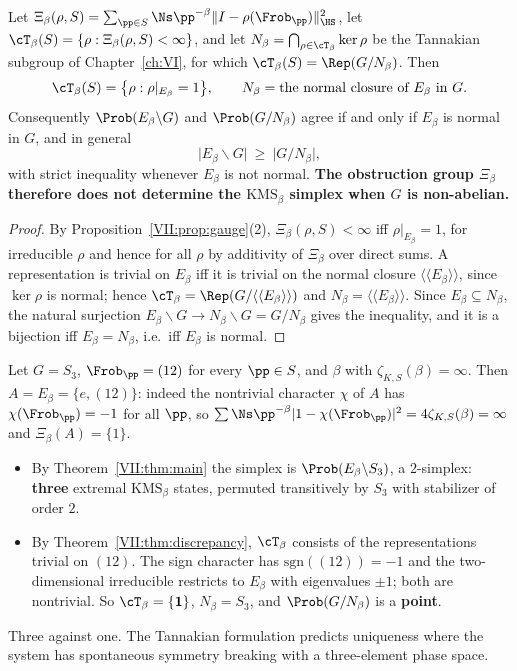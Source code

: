 \begin{theorem}[Discrepancy]\label{VII:thm:discrepancy}
Let $\Xi_\beta(\rho,S)=\sum_{\pp\in S}\Ns\pp^{-\beta}\|I-\rho(\Frob_\pp)\|_{\HS}^2$, let
$\cT_\beta(S)=\{\rho:\Xi_\beta(\rho,S)<\infty\}$, and let $N_\beta=\bigcap_{\rho\in\cT_\beta}\ker\rho$
be the Tannakian subgroup of Chapter~\ref{ch:VI}, for which $\cT_\beta(S)=\Rep(G/N_\beta)$. Then
\[
\cT_\beta(S)=\bigl\{\rho:\rho|_{E_\beta}=1\bigr\},
\qquad
N_\beta=\text{the normal closure of }E_\beta\text{ in }G .
\]
Consequently $\Prob(E_\beta\backslash G)$ and $\Prob(G/N_\beta)$ agree if and only if
$E_\beta$ is normal in $G$, and in general
\[
\bigl|E_\beta\backslash G\bigr|\ \ge\ \bigl|G/N_\beta\bigr| ,
\]
with strict inequality whenever $E_\beta$ is not normal. \textbf{The obstruction group
$\Xi_\beta$ therefore does not determine the $\mathrm{KMS}_\beta$ simplex when $G$ is
non-abelian.}
\end{theorem}

\begin{proof}
By Proposition~\ref{VII:prop:gauge}(2), $\Xi_\beta(\rho,S)<\infty$ iff $\rho|_{E_\beta}=1$, for
irreducible $\rho$ and hence for all $\rho$ by additivity of $\Xi_\beta$ over direct sums.
A representation is
trivial on $E_\beta$ iff it is trivial on the normal closure $\langle\langle E_\beta\rangle\rangle$,
since $\ker\rho$ is normal; hence $\cT_\beta=\Rep(G/\langle\langle E_\beta\rangle\rangle)$ and
$N_\beta=\langle\langle E_\beta\rangle\rangle$. Since $E_\beta\subseteq N_\beta$, the natural
surjection $E_\beta\backslash G\to N_\beta\backslash G=G/N_\beta$ gives the inequality, and it
is a bijection iff $E_\beta=N_\beta$, i.e.\ iff $E_\beta$ is normal.
\end{proof}

\begin{example}\label{VII:ex:S3}
Let $G=S_3$, $\Frob_\pp=(12)$ for every $\pp\in S$, and $\beta$ with
$\zeta_{K,S}(\beta)=\infty$. Then $A=E_\beta=\{e,(12)\}$: indeed the nontrivial character
$\chi$ of $A$ has $\chi(\Frob_\pp)=-1$ for all $\pp$, so
$\sum\Ns\pp^{-\beta}|1-\chi(\Frob_\pp)|^2=4\zeta_{K,S}(\beta)=\infty$ and
$\Xi_\beta(A)=\{1\}$.
\begin{itemize}
\item By Theorem~\ref{VII:thm:main} the simplex is $\Prob(E_\beta\backslash S_3)$, a
$2$-simplex: \textbf{three} extremal $\mathrm{KMS}_\beta$ states, permuted transitively by
$S_3$ with stabilizer of order $2$.
\item By Theorem~\ref{VII:thm:discrepancy}, $\cT_\beta$ consists of the representations trivial
on $(12)$. The sign character has $\mathrm{sgn}((12))=-1$ and the two-dimensional
irreducible restricts to $E_\beta$ with eigenvalues $\pm1$; both are nontrivial. So
$\cT_\beta=\{\mathbf 1\}$, $N_\beta=S_3$, and $\Prob(G/N_\beta)$ is a \textbf{point}.
\end{itemize}
Three against one. The Tannakian formulation predicts uniqueness where the system has
spontaneous symmetry breaking with a three-element phase space.
\end{example}

